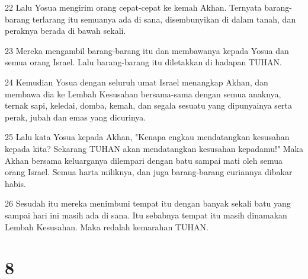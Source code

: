 \par 22 Lalu Yosua mengirim orang cepat-cepat ke kemah Akhan. Ternyata barang-barang terlarang itu semuanya ada di sana, disembunyikan di dalam tanah, dan peraknya berada di bawah sekali.
\par 23 Mereka mengambil barang-barang itu dan membawanya kepada Yosua dan semua orang Israel. Lalu barang-barang itu diletakkan di hadapan TUHAN.
\par 24 Kemudian Yosua dengan seluruh umat Israel menangkap Akhan, dan membawa dia ke Lembah Kesusahan bersama-sama dengan semua anaknya, ternak sapi, keledai, domba, kemah, dan segala sesuatu yang dipunyainya serta perak, jubah dan emas yang dicurinya.
\par 25 Lalu kata Yosua kepada Akhan, "Kenapa engkau mendatangkan kesusahan kepada kita? Sekarang TUHAN akan mendatangkan kesusahan kepadamu!" Maka Akhan bersama keluarganya dilempari dengan batu sampai mati oleh semua orang Israel. Semua harta miliknya, dan juga barang-barang curiannya dibakar habis.
\par 26 Sesudah itu mereka menimbuni tempat itu dengan banyak sekali batu yang sampai hari ini masih ada di sana. Itu sebabnya tempat itu masih dinamakan Lembah Kesusahan. Maka redalah kemarahan TUHAN.

\chapter{8}

